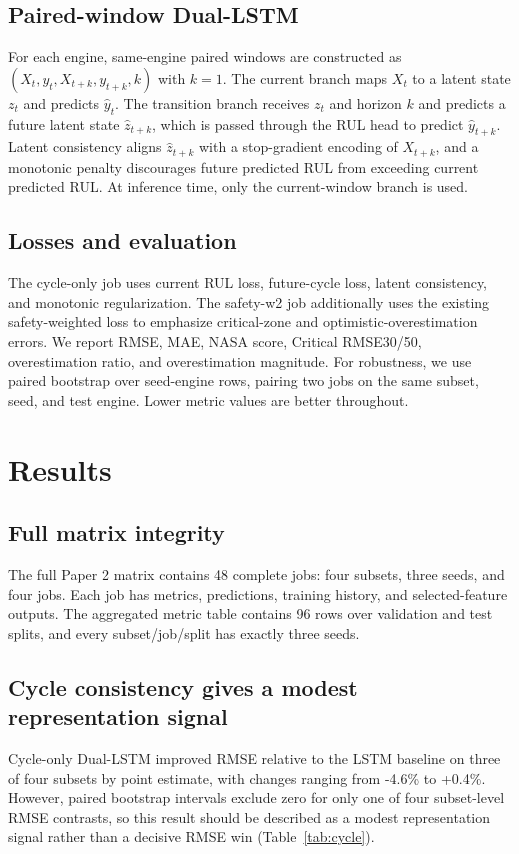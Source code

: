 \documentclass[10pt,twocolumn]{article}
\begin{document}
\subsection{Paired-window Dual-LSTM}
For each engine, same-engine paired windows are constructed as $(X_t,y_t,X_{t+k},y_{t+k},k)$ with $k=1$. The current branch maps $X_t$ to a latent state $z_t$ and predicts $\hat{y}_t$. The transition branch receives $z_t$ and horizon $k$ and predicts a future latent state $\hat{z}_{t+k}$, which is passed through the RUL head to predict $\hat{y}_{t+k}$. Latent consistency aligns $\hat{z}_{t+k}$ with a stop-gradient encoding of $X_{t+k}$, and a monotonic penalty discourages future predicted RUL from exceeding current predicted RUL. At inference time, only the current-window branch is used.

\subsection{Losses and evaluation}
The cycle-only job uses current RUL loss, future-cycle loss, latent consistency, and monotonic regularization. The safety-w2 job additionally uses the existing safety-weighted loss to emphasize critical-zone and optimistic-overestimation errors. We report RMSE, MAE, NASA score, Critical RMSE30/50, overestimation ratio, and overestimation magnitude. For robustness, we use paired bootstrap over seed-engine rows, pairing two jobs on the same subset, seed, and test engine. Lower metric values are better throughout.

\section{Results}
\subsection{Full matrix integrity}
The full Paper 2 matrix contains 48 complete jobs: four subsets, three seeds, and four jobs. Each job has metrics, predictions, training history, and selected-feature outputs. The aggregated metric table contains 96 rows over validation and test splits, and every subset/job/split has exactly three seeds.

\subsection{Cycle consistency gives a modest representation signal}
Cycle-only Dual-LSTM improved RMSE relative to the LSTM baseline on three of four subsets by point estimate, with changes ranging from -4.6\% to +0.4\%. However, paired bootstrap intervals exclude zero for only one of four subset-level RMSE contrasts, so this result should be described as a modest representation signal rather than a decisive RMSE win (Table~\ref{tab:cycle}).
\end{document}
